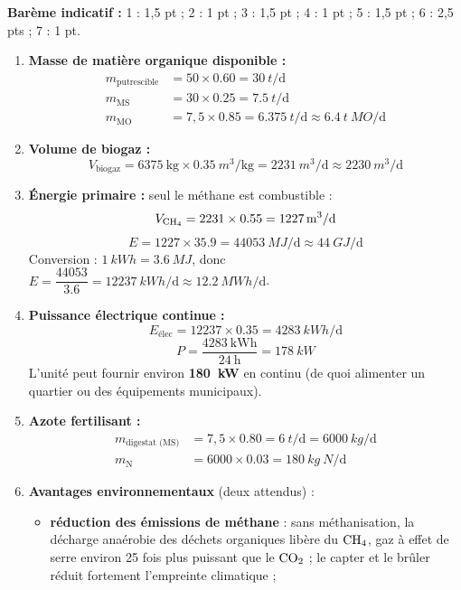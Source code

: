 \documentclass[11pt]{article}
\begin{document}
\begin{corrige}
\textbf{Barème indicatif :} 1 : 1,5 pt ; 2 : 1 pt ; 3 : 1,5 pt ; 4 : 1 pt ; 5 : 1,5 pt ; 6 : 2,5 pts ; 7 : 1 pt.

\begin{enumerate}
\item \textbf{Masse de matière organique disponible :}
\begin{align*}
m_{\text{putrescible}} &= 50 \times \num{0,60} = \SI{30}{t\per\day} \\
m_{\text{MS}} &= 30 \times \num{0,25} = \SI{7,5}{t\per\day} \\
m_{\text{MO}} &= 7,5 \times \num{0,85} = \SI{6,375}{t\per\day} \approx \SI{6,4}{t\ MO\per\day}
\end{align*}
\item \textbf{Volume de biogaz :}
\[ V_{\text{biogaz}} = 6375\ \text{kg} \times \SI{0,35}{m^3\per\kg} = \SI{2231}{m^3\per\day} \approx \SI{2230}{m^3\per\day} \]
\item \textbf{Énergie primaire :} seul le méthane est combustible :
\[ V_{\ce{CH4}} = 2231 \times \num{0,55} = \SI{1227}{m^3\per\day} \]
\[ E = 1227 \times \num{35,9} = \SI{44053}{MJ\per\day} \approx \SI{44}{GJ\per\day} \]
Conversion : $\SI{1}{kWh} = \SI{3,6}{MJ}$, donc $E = \dfrac{44053}{\num{3,6}} = \SI{12237}{kWh\per\day} \approx \SI{12,2}{MWh\per\day}$.
\item \textbf{Puissance électrique continue :}
\[ E_{\text{élec}} = 12237 \times \num{0,35} = \SI{4283}{kWh\per\day} \]
\[ P = \frac{4283\ \text{kWh}}{24\ \text{h}} = \SI{178}{kW} \]
L'unité peut fournir environ \textbf{\SI{180}{kW}} en continu (de quoi alimenter un quartier ou des équipements municipaux).
\item \textbf{Azote fertilisant :}
\begin{align*}
m_{\text{digestat (MS)}} &= 7,5 \times \num{0,80} = \SI{6}{t\per\day} = \SI{6000}{kg\per\day} \\
m_{\text{N}} &= 6000 \times \num{0,03} = \SI{180}{kg\ N\per\day}
\end{align*}
\item \textbf{Avantages environnementaux} (deux attendus) :
\begin{itemize}
\item \textbf{réduction des émissions de méthane} : sans méthanisation, la décharge anaérobie des déchets organiques libère du $\ce{CH4}$, gaz à effet de serre environ 25 fois plus puissant que le $\ce{CO2}$ ; le capter et le brûler réduit fortement l'empreinte climatique ;

\end{itemize}
\end{enumerate}
\end{corrige}
\end{document}
